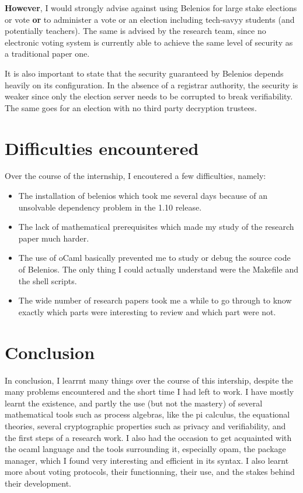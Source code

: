 \documentclass[12pt, a4paper]{report}
\begin{document}
\textbf{However}, I would strongly advise against using Belenios for large stake elections or vote \textbf{or} to administer a vote or an election including tech-savyy students (and potentially teachers). The same is advised by the research team, since no electronic voting system is currently able to achieve the same level of security as a traditional paper one. 

It is also important to state that the security guaranteed by Belenios depends heavily on its configuration. In the absence of a registrar authority, the security is weaker since only the election server needs to be corrupted to break verifiability. The same goes for an election with no third party decryption trustees. 

\section{Difficulties encountered}

Over the course of the internship, I encoutered a few difficulties, namely:

\begin{itemize}
\item The installation of belenios which took me several days because of an unsolvable dependency problem in the 1.10 release.
\item The lack of mathematical prerequisites which made my study of the research paper much harder.
\item The use of oCaml basically prevented me to study or debug the source code of Belenios. The only thing I could actually understand were the Makefile and the shell scripts.
\item The wide number of research papers took me a while to go through to know exactly which parts were interesting to review and which part were not.
\end{itemize}

\section{Conclusion}

In conclusion, I learrnt many things over the course of this intership, despite the many problems encountered and the short time I had left to work. I have mostly learnt the existence, and partly the use (but not the mastery) of several mathematical tools such as process algebras, like the pi calculus, the equational theories, several cryptographic properties such as privacy and verifiability, and the first steps of a research work. I also had the occasion to get acquainted with the ocaml language and the tools surrounding it, especially opam, the package manager, which I found very interesting and efficient in its syntax. I also learnt more about voting protocols, their functionning, their use, and the stakes behind their development. 
\end{document}
